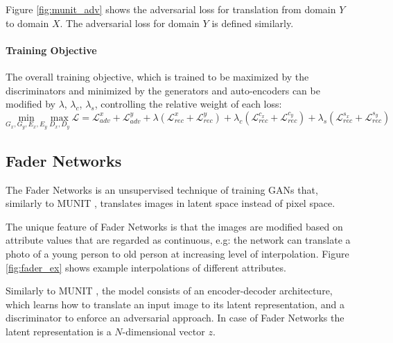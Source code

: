 \documentclass[12pt]{report}
\begin{document}
Figure \ref{fig:munit_adv} shows the adversarial loss for translation from domain $Y$ to domain $X$. The adversarial loss for domain $Y$ is defined similarly.


\paragraph{Training Objective}
The overall training objective, which is trained to be maximized by the discriminators and minimized by the generators and auto-encoders can be modified by $\lambda$, $\lambda_c$, $\lambda_s$, controlling the relative weight of each loss:
\begin{equation}
\underset{G_x, G_y, E_x, E_y}{\mathrm{min}} \ \underset{D_x, D_y}{\mathrm{max}} \ \mathcal{L} = \mathcal{L}^{x}_{adv} + \mathcal{L}^{y}_{adv} + 
\lambda(\mathcal{L}^{x}_{rec} + \mathcal{L}^{y}_{rec}) + 
\lambda_c(\mathcal{L}^{c_x}_{rec} + \mathcal{L}^{c_y}_{rec}) + 
\lambda_s(\mathcal{L}^{s_x}_{rec} + \mathcal{L}^{s_y}_{rec})
\end{equation}


\pagebreak
\subsection{Fader Networks}
The Fader Networks \cite{lample_fader_2017} is an unsupervised technique of training GANs that, similarly to MUNIT \cite{huang_multimodal_2018}, translates images in latent space instead of pixel space. 

The unique feature of Fader Networks is that the images are modified based on attribute values that are regarded as continuous, e.g: the network can translate a photo of a young person to old person at increasing level of interpolation. Figure \ref{fig:fader_ex} shows example interpolations of different attributes.

Similarly to MUNIT \cite{huang_multimodal_2018}, the model consists of an encoder-decoder architecture, which learns how to translate an input image to its latent representation, and a discriminator to enforce an adversarial approach. In case of Fader Networks the latent representation is a $N$-dimensional vector $z$.
\end{document}

